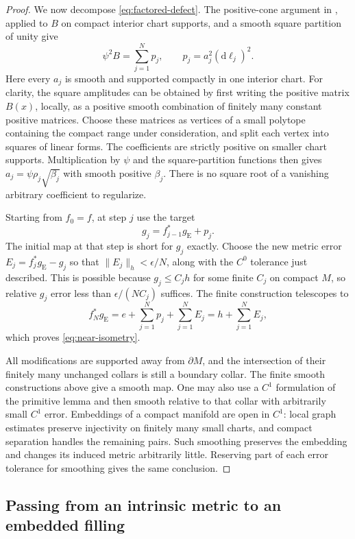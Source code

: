 \documentclass[11pt]{article}
\theoremstyle{remark}
\begin{document}
\begin{proof}
We now decompose \eqref{eq:factored-defect}. The positive-cone argument
in \cite[Lemma~21.3.1, p.~193]{EM}, applied to $B$ on compact interior
chart supports, and a smooth square partition of unity give
\begin{equation}\label{eq:primitive-sum}
 \psi^2 B=\sum_{j=1}^N p_j,
 \qquad p_j=a_j^2(\mathrm d\ell_j)^2.
\end{equation}
Here every $a_j$ is smooth and supported compactly in one interior chart.
For clarity, the square amplitudes can be obtained by first writing the
positive matrix $B(x)$, locally, as a positive smooth combination of
finitely many constant positive matrices. Choose these matrices as
vertices of a small polytope containing the compact range under
consideration, and split each vertex into squares of linear forms.
The coefficients are strictly positive on smaller chart supports.
Multiplication by $\psi$ and the square-partition functions then gives
$a_j=\psi\rho_j\sqrt{\beta_j}$ with smooth positive $\beta_j$.
There is no square root of a vanishing arbitrary coefficient to regularize.

Starting from $f_0=f$, at step $j$ use the target
\[
 g_j=f_{j-1}^*g_{\mathrm E}+p_j.
\]
The initial map at that step is short for $g_j$ exactly. Choose the
new metric error
$E_j=f_j^*g_{\mathrm E}-g_j$ so that $\|E_j\|_h<\epsilon/N$,
along with the $C^0$ tolerance just described. This is possible because
$g_j\leq C_jh$ for some finite $C_j$ on compact $M$, so relative
$g_j$ error less than $\epsilon/(NC_j)$ suffices. The finite construction
telescopes to
\[
 f_N^*g_{\mathrm E}
   =e+\sum_{j=1}^Np_j+\sum_{j=1}^NE_j
   =h+\sum_{j=1}^NE_j,
\]
which proves \eqref{eq:near-isometry}.

All modifications are supported away from $\partial M$, and the
intersection of their finitely many unchanged collars is still a
boundary collar. The finite smooth constructions above give a smooth
map. One may also use a $C^1$ formulation of the primitive lemma and
then smooth relative to that collar with arbitrarily small $C^1$ error.
Embeddings of a compact manifold are open in $C^1$: local graph estimates
preserve injectivity on finitely many small charts, and compact separation
handles the remaining pairs. Such smoothing preserves the embedding and
changes its induced metric arbitrarily little. Reserving part of each
error tolerance for smoothing gives the same conclusion.
\end{proof}

\subsection{Passing from an intrinsic metric to an embedded filling}
\end{document}
